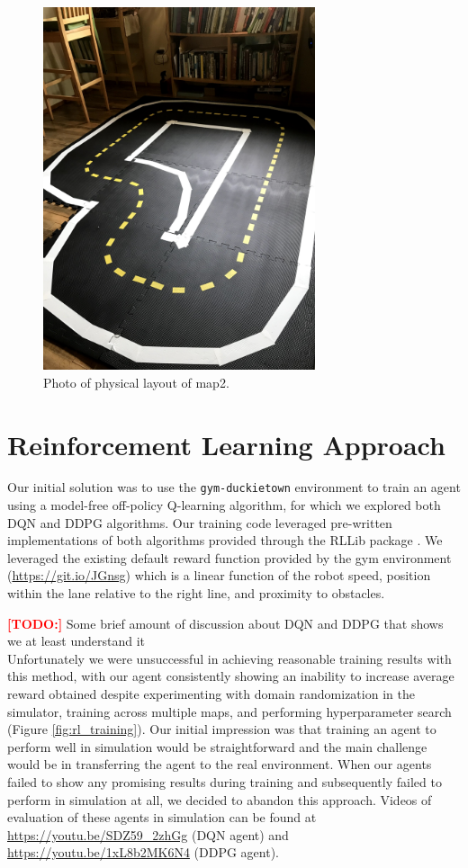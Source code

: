 \documentclass{article}
\newcommand\todo{\textcolor{red}{\textbf{[TODO:] }}}
\begin{document}
\begin{figure}[H]
\includegraphics[angle=-90,width=8cm,keepaspectratio]{map2_real}
\centering
\caption{Photo of physical layout of map2.}
\label{fig:map2_real}
\end{figure}

\section{Reinforcement Learning Approach}

Our initial solution was to use the \texttt{gym-duckietown} environment to train an agent using a model-free off-policy Q-learning algorithm, for which we explored both DQN \cite{DBLP:journals/corr/MnihKSGAWR13} and DDPG \cite{journals/corr/LillicrapHPHETS15} algorithms. Our training code leveraged pre-written implementations of both algorithms provided through the RLLib package \cite{DBLP:journals/corr/abs-1712-09381}. We leveraged the existing default reward function provided by the gym environment (\url{https://git.io/JGnsg}) which is a linear function of the robot speed, position within the lane relative to the right line, and proximity to obstacles.

\todo Some brief amount of discussion about DQN and DDPG that shows we at least understand it \\

Unfortunately we were unsuccessful in achieving reasonable training results with this method, with our agent consistently showing an inability to increase average reward obtained despite experimenting with domain randomization in the simulator, training across multiple maps, and performing hyperparameter search (Figure \ref{fig:rl_training}). Our initial impression was that training an agent to perform well in simulation would be straightforward and the main challenge would be in transferring the agent to the real environment. When our agents failed to show any promising results during training and subsequently failed to perform in simulation at all, we decided to abandon this approach. Videos of evaluation of these agents in simulation can be found at \url{https://youtu.be/SDZ59_2zhGg} (DQN agent) and \url{https://youtu.be/1xL8b2MK6N4} (DDPG agent).
\end{document}
